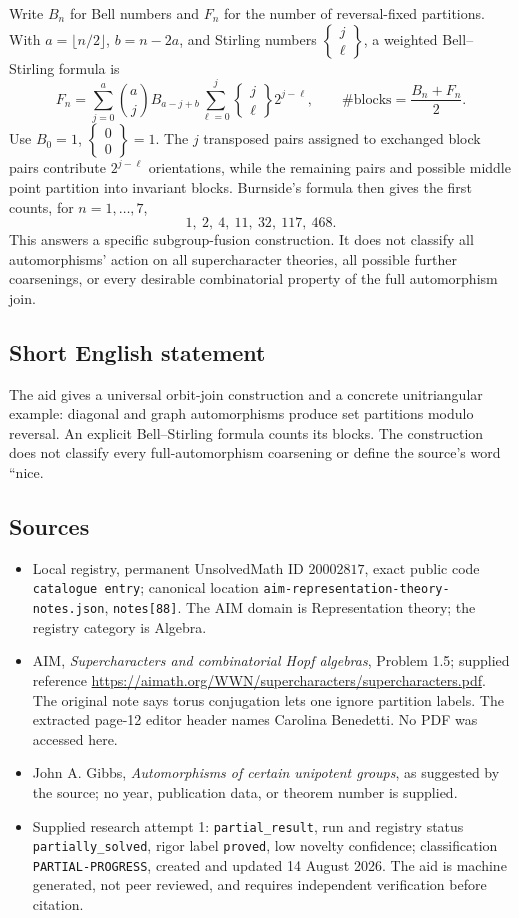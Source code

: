\documentclass[11pt]{article}
\begin{document}
Write \(B_n\) for Bell numbers and \(F_n\) for the number of reversal-fixed partitions. With \(a=\lfloor n/2\rfloor\), \(b=n-2a\), and Stirling numbers \(\begin{Bmatrix}j\\\ell\end{Bmatrix}\), a weighted Bell--Stirling formula is
\[
 F_n=\sum_{j=0}^a\binom aj B_{a-j+b}
 \sum_{\ell=0}^j \begin{Bmatrix}j\\\ell\end{Bmatrix}2^{j-\ell},
 \qquad\#\text{blocks}=\frac{B_n+F_n}{2}.
\]
Use \(B_0=1\), \(\begin{Bmatrix}0\\0\end{Bmatrix}=1\). The \(j\) transposed pairs assigned to exchanged block pairs contribute \(2^{j-\ell}\) orientations, while the remaining pairs and possible middle point partition into invariant blocks. Burnside's formula then gives the first counts, for \(n=1,\ldots,7\),
\[
 1,\ 2,\ 4,\ 11,\ 32,\ 117,\ 468.
\]
This answers a specific subgroup-fusion construction. It does not classify all automorphisms' action on all supercharacter theories, all possible further coarsenings, or every desirable combinatorial property of the full automorphism join.
\subsection{Short English statement}
The aid gives a universal orbit-join construction and a concrete unitriangular example: diagonal and graph automorphisms produce set partitions modulo reversal. An explicit Bell--Stirling formula counts its blocks. The construction does not classify every full-automorphism coarsening or define the source's word ``nice.
\subsection{Sources}
\begin{itemize}
\item Local registry, permanent UnsolvedMath ID \(20002817\), exact public code \texttt{catalogue entry}; canonical location \texttt{aim-representation-theory-notes.json}, \texttt{notes[88]}. The AIM domain is Representation theory; the registry category is Algebra.
\item AIM, \emph{Supercharacters and combinatorial Hopf algebras}, Problem 1.5; supplied reference \url{https://aimath.org/WWN/supercharacters/supercharacters.pdf}. The original note says torus conjugation lets one ignore partition labels. The extracted page-12 editor header names Carolina Benedetti. No PDF was accessed here.
\item John A. Gibbs, \emph{Automorphisms of certain unipotent groups}, as suggested by the source; no year, publication data, or theorem number is supplied.
\item Supplied research attempt 1: \texttt{partial\_result}, run and registry status \texttt{partially\_solved}, rigor label \texttt{proved}, low novelty confidence; classification \texttt{PARTIAL-PROGRESS}, created and updated 14 August 2026. The aid is machine generated, not peer reviewed, and requires independent verification before citation.
\end{itemize}
\end{document}
